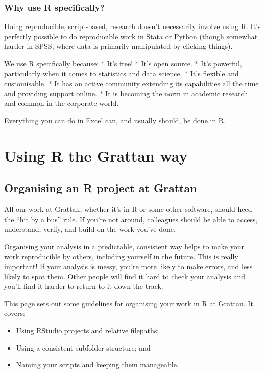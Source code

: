 \documentclass[]{book}
\providecommand{\tightlist}{%
  \setlength{\itemsep}{0pt}\setlength{\parskip}{0pt}}
\begin{document}
\hypertarget{why-R}{%
\section{Why use R specifically?}\label{why-R}}

Doing reproducible, script-based, research doesn't necessarily involve using R. It's perfectly possible to do reproducible work in Stata or Python (though somewhat harder in SPSS, where data is primarily manipulated by clicking things).

We use R specifically because:
* It's free!
* It's open source.
* It's powerful, particularly when it comes to statistics and data science.
* It's flexible and customisable.
* It has an active community extending its capabilities all the time and providing support online.
* It is becoming the norm in academic research and common in the corporate world.

Everything you can do in Excel can, and usually should, be done in R.

\hypertarget{part-using-r-the-grattan-way}{%
\part{Using R the Grattan way}\label{part-using-r-the-grattan-way}}

\hypertarget{organising-projects}{%
\chapter{Organising an R project at Grattan}\label{organising-projects}}

All our work at Grattan, whether it's in R or some other software, should heed the ``hit by a bus'' rule. If you're not around, colleagues should be able to access, understand, verify, and build on the work you've done.

Organising your analysis in a predictable, consistent way helps to make your work reproducible by others, including yourself in the future. This is really important! If your analysis is messy, you're more likely to make errors, and less likely to spot them. Other people will find it hard to check your analysis and you'll find it harder to return to it down the track.

This page sets out some guidelines for organising your work in R at Grattan. It covers:

\begin{itemize}
\tightlist
\item
  Using RStudio projects and relative filepaths;
\item
  Using a consistent subfolder structure; and
\item
  Naming your scripts and keeping them manageable.
\end{itemize}
\end{document}
